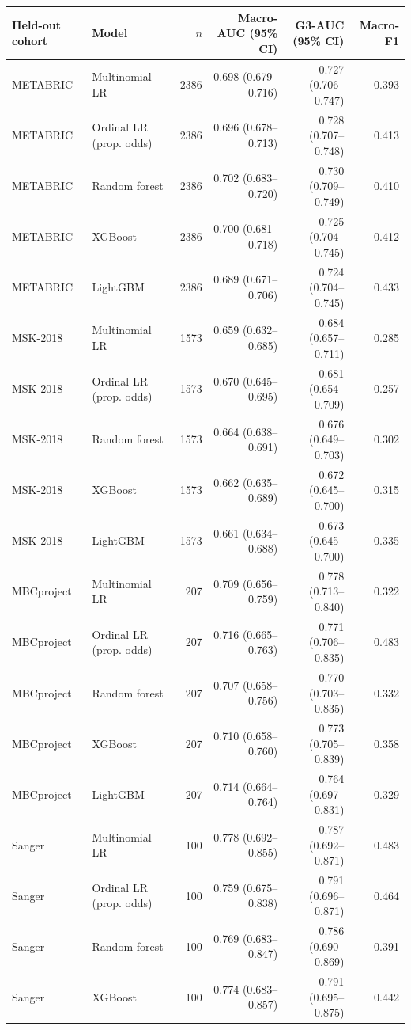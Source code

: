 \begin{tabular}{llrrrr}
\toprule
Held-out cohort & Model & $n$ & Macro-AUC (95\% CI) & G3-AUC (95\% CI) & Macro-F1 \\
\midrule
METABRIC & Multinomial LR & 2386 & 0.698 (0.679--0.716) & 0.727 (0.706--0.747) & 0.393 \\
METABRIC & Ordinal LR (prop. odds) & 2386 & 0.696 (0.678--0.713) & 0.728 (0.707--0.748) & 0.413 \\
METABRIC & Random forest & 2386 & 0.702 (0.683--0.720) & 0.730 (0.709--0.749) & 0.410 \\
METABRIC & XGBoost & 2386 & 0.700 (0.681--0.718) & 0.725 (0.704--0.745) & 0.412 \\
METABRIC & LightGBM & 2386 & 0.689 (0.671--0.706) & 0.724 (0.704--0.745) & 0.433 \\
\addlinespace
MSK-2018 & Multinomial LR & 1573 & 0.659 (0.632--0.685) & 0.684 (0.657--0.711) & 0.285 \\
MSK-2018 & Ordinal LR (prop. odds) & 1573 & 0.670 (0.645--0.695) & 0.681 (0.654--0.709) & 0.257 \\
MSK-2018 & Random forest & 1573 & 0.664 (0.638--0.691) & 0.676 (0.649--0.703) & 0.302 \\
MSK-2018 & XGBoost & 1573 & 0.662 (0.635--0.689) & 0.672 (0.645--0.700) & 0.315 \\
MSK-2018 & LightGBM & 1573 & 0.661 (0.634--0.688) & 0.673 (0.645--0.700) & 0.335 \\
\addlinespace
MBCproject & Multinomial LR & 207 & 0.709 (0.656--0.759) & 0.778 (0.713--0.840) & 0.322 \\
MBCproject & Ordinal LR (prop. odds) & 207 & 0.716 (0.665--0.763) & 0.771 (0.706--0.835) & 0.483 \\
MBCproject & Random forest & 207 & 0.707 (0.658--0.756) & 0.770 (0.703--0.835) & 0.332 \\
MBCproject & XGBoost & 207 & 0.710 (0.658--0.760) & 0.773 (0.705--0.839) & 0.358 \\
MBCproject & LightGBM & 207 & 0.714 (0.664--0.764) & 0.764 (0.697--0.831) & 0.329 \\
\addlinespace
Sanger & Multinomial LR & 100 & 0.778 (0.692--0.855) & 0.787 (0.692--0.871) & 0.483 \\
Sanger & Ordinal LR (prop. odds) & 100 & 0.759 (0.675--0.838) & 0.791 (0.696--0.871) & 0.464 \\
Sanger & Random forest & 100 & 0.769 (0.683--0.847) & 0.786 (0.690--0.869) & 0.391 \\
Sanger & XGBoost & 100 & 0.774 (0.683--0.857) & 0.791 (0.695--0.875) & 0.442 \\

\end{tabular}
